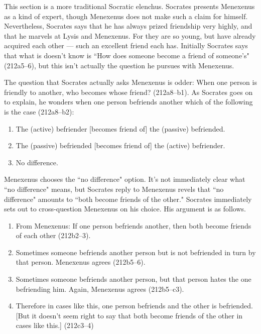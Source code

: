 \documentclass[11pt]{article}
\begin{document}
This section is a more traditional Socratic elenchus.  Socrates presents Menexenus as a kind of expert, though Menexenus does not make such a claim for himself.  Nevertheless, Socrates says that he has always prized friendship very highly, and that he marvels at Lysis and Menexenus. For they are so young, but have already acquired each other --- such an excellent friend each has.  Initially Socrates says that what is doesn't know is ``How does someone become a friend of someone's" (212a5--6), but this isn't actually the question he pursues with Menexenus.

The question that Socrates actually asks Menexenus is odder: When one person is friendly to another, who becomes whose friend? (212a8--b1).  As Socrates goes on to explain, he wonders when one person befriends another which of the following is the case (212a8--b2):

\begin{enumerate}
    \item The (active) befriender [becomes friend of] the (passive) befriended.
    \item The (passive) befriended [becomes friend of] the (active) befriender.
    \item No difference.
\end{enumerate}

Menexenus chooses the ``no difference" option.  It's not immediately clear what ``no difference" means, but Socrates reply to Menexenus revels that ``no difference" amounts to ``both become friends of the other."  Socrates immediately sets out to cross-question Menexenus on his choice.  His argument is as follows.

\begin{enumerate}
    \item From Menexenus: If one person befriends another, then both become friends of each other (212b2--3).
    \item Sometimes someone befriends another person but is not befriended in turn by that person.  Menexenus agrees (212b5--6).
    \item Sometimes someone befriends another person, but that person hates the one befriending him.  Again, Menexenus agrees (212b5--c3).
    \item Therefore in cases like this, one person befriends and the other is befriended. [But it doesn't seem right to say that both become friends of the other in cases like this.] (212c3--4)
\end{enumerate}
\end{document}
